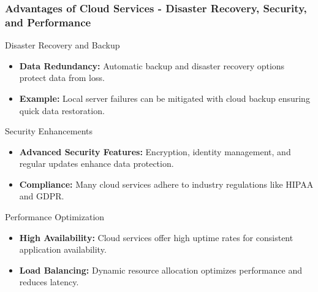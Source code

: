 \documentclass{beamer}
\begin{document}
\begin{frame}[fragile]
    \frametitle{Advantages of Cloud Services - Disaster Recovery, Security, and Performance}
    \begin{block}{Disaster Recovery and Backup}
        \begin{itemize}
            \item \textbf{Data Redundancy:} Automatic backup and disaster recovery options protect data from loss.
            \item \textbf{Example:} Local server failures can be mitigated with cloud backup ensuring quick data restoration.
        \end{itemize}
    \end{block}

    \begin{block}{Security Enhancements}
        \begin{itemize}
            \item \textbf{Advanced Security Features:} Encryption, identity management, and regular updates enhance data protection.
            \item \textbf{Compliance:} Many cloud services adhere to industry regulations like HIPAA and GDPR.
        \end{itemize}
    \end{block}

    \begin{block}{Performance Optimization}
        \begin{itemize}
            \item \textbf{High Availability:} Cloud services offer high uptime rates for consistent application availability.
            \item \textbf{Load Balancing:} Dynamic resource allocation optimizes performance and reduces latency.
        \end{itemize}
    \end{block}
\end{frame}
\end{document}
